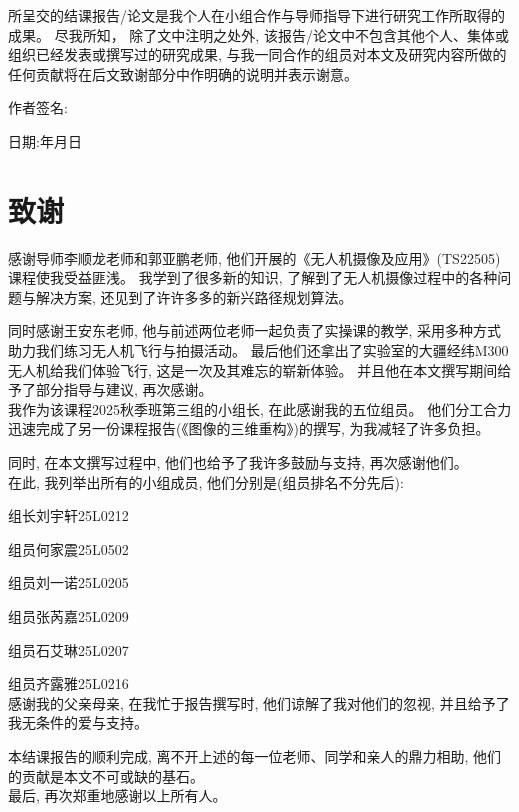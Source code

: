 \documentclass[12pt,a4paper,oneside,UTF8]{ctexart}
\begin{document}
所呈交的结课报告/论文是我个人在小组合作与导师指导下进行研究工作所取得的成果。
尽我所知，
除了文中注明之处外,
该报告/论文中不包含其他个人、集体或组织已经发表或撰写过的研究成果,
与我一同合作的组员对本文及研究内容所做的任何贡献将在后文致谢部分中作明确的说明并表示谢意。

作者签名:

日期:\qquad 年\qquad 月\qquad 日
\newpage\section{致谢}
感谢导师李顺龙老师和郭亚鹏老师,
他们开展的《无人机摄像及应用》(TS22505)课程使我受益匪浅。
我学到了很多新的知识,
了解到了无人机摄像过程中的各种问题与解决方案,
还见到了许许多多的新兴路径规划算法。

同时感谢王安东老师,
他与前述两位老师一起负责了实操课的教学,
采用多种方式助力我们练习无人机飞行与拍摄活动。
最后他们还拿出了实验室的大疆经纬M300无人机给我们体验飞行,
这是一次及其难忘的崭新体验。
并且他在本文撰写期间给予了部分指导与建议,
再次感谢。
~\\

我作为该课程2025秋季班第三组的小组长,
在此感谢我的五位组员。
他们分工合力迅速完成了另一份课程报告(《图像的三维重构》)的撰写,
为我减轻了许多负担。

同时,
在本文撰写过程中,
他们也给予了我许多鼓励与支持,
再次感谢他们。
~\\

在此,
我列举出所有的小组成员,
他们分别是(组员排名不分先后):

\qquad 组长\quad 刘宇轩\quad 25L0212

\qquad 组员\quad 何家震\quad 25L0502

\qquad 组员\quad 刘一诺\quad 25L0205

\qquad 组员\quad 张芮嘉\quad 25L0209

\qquad 组员\quad 石艾琳\quad 25L0207

\qquad 组员\quad 齐露雅\quad 25L0216
~\\

感谢我的父亲母亲,
在我忙于报告撰写时,
他们谅解了我对他们的忽视,
并且给予了我无条件的爱与支持。

本结课报告的顺利完成,
离不开上述的每一位老师、同学和亲人的鼎力相助,
他们的贡献是本文不可或缺的基石。
~\\

最后,
再次郑重地感谢以上所有人。
\end{document}
